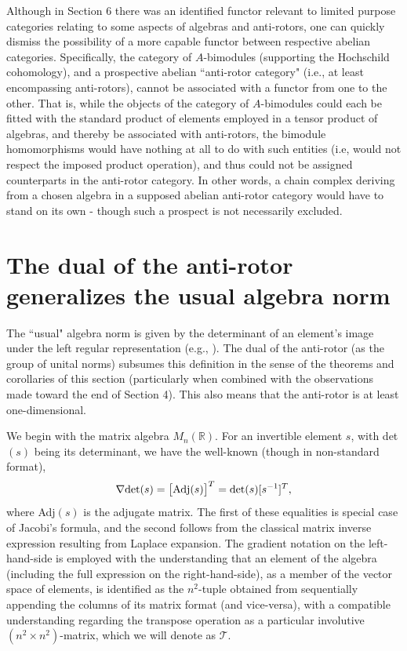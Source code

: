 \documentclass{amsart}
\numberwithin{equation}{section}
\theoremstyle{definition}
\numberwithin{theorem}{section}
\begin{document}
Although in Section 6 there was an identified functor relevant to limited purpose categories relating to some aspects of algebras and anti-rotors, one can quickly dismiss the possibility of a more capable functor between respective abelian categories.  Specifically, the category of $A$-bimodules (supporting the Hochschild cohomology), and a prospective abelian ``anti-rotor category" (i.e., at least encompassing anti-rotors), cannot be associated with a functor from one to the other.  That is, while the objects of the category of $A$-bimodules could each be fitted with the standard product of elements employed in a tensor product of algebras, and thereby be associated with anti-rotors, the bimodule homomorphisms would have nothing at all to do with such entities (i.e, would not respect the imposed product operation), and thus could not be assigned counterparts in the anti-rotor category.  In other words, a chain complex deriving from a chosen algebra in a supposed abelian anti-rotor category would have to stand on its own - though such a prospect is not necessarily excluded.

\section{The dual of the anti-rotor generalizes the usual algebra norm} 

The ``usual" algebra norm is given by the determinant of an element's image under the left regular representation (e.g., \cite{bourbaki:1989}).  The dual of the anti-rotor (as the group of unital norms) subsumes this definition in the sense of the theorems and corollaries of this section (particularly when combined with the observations made toward the end of Section 4).  This also means that the anti-rotor is at least one-dimensional.

 We begin with the matrix algebra $ M_n(\mathbb{R})$. For an invertible element $s$, with det$(s)$ being its determinant, we have the well-known (though in non-standard format),
  \begin{equation}\label{11/5/21.1} \nabla \mbox{det}(s) = \big[{\rm Adj}(s)\big]^T = \mbox{det}(s)[s^{-1}]^T,\end{equation} where Adj$(s)$ is the adjugate matrix.  The first of these equalities is special case of Jacobi's formula, and the second follows from the classical matrix inverse expression resulting from Laplace expansion.  The gradient notation on the left-hand-side is employed with the understanding that an element of the algebra (including the full expression on the right-hand-side), as a member of the vector space of elements, is identified as the $n^2$-tuple obtained from sequentially appending the columns of its matrix format (and vice-versa), with a compatible understanding  regarding the transpose operation as a particular involutive $(n^2\times n^2)$-matrix, which we will denote as $\mathcal{T}$. 
  
\end{document}
